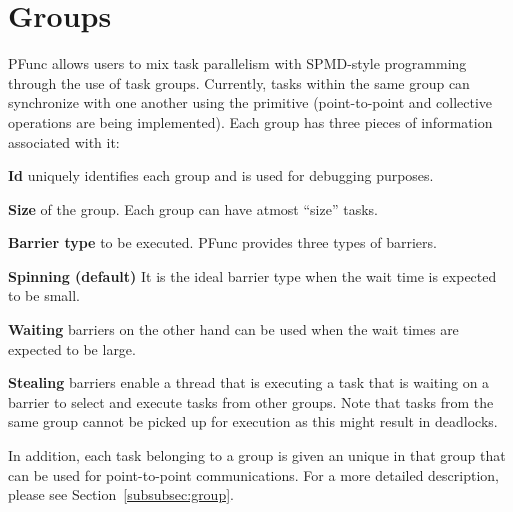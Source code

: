 \section{Groups}
\label{sec:group}
PFunc allows users to mix task parallelism with SPMD-style programming through
the use of task groups.  
%
Currently, tasks within the same group can synchronize with one another using 
the  primitive (point-to-point and collective operations are
being implemented).
%
Each group has three pieces of information associated with it:
%
\begin{list}{}{\leftmargin=1em}
\item \textbf{Id} uniquely identifies each group and is used for debugging
purposes.
\item \textbf{Size} of the group. Each group can have atmost ``size'' tasks.
\item \textbf{Barrier type} to be executed. PFunc provides three types of
barriers.
  \begin{list}{}{\leftmargin=1em}
  \item \textbf{Spinning (default)} It is the ideal barrier type when the wait
  time is expected to be small.
  \item \textbf{Waiting} barriers on the other hand can be used when the wait 
  times are expected to be large.
  \item \textbf{Stealing} barriers enable a thread that is executing a task 
  that is waiting on a barrier to select and execute tasks from other groups.
  Note that tasks from the same group cannot be picked up for execution as 
  this might result in deadlocks.
  \end{list}
\end{list}
%
In addition, each task belonging to a group is given an unique  in
that group that can be used for point-to-point communications.
%
For a more detailed description, please see Section~\ref{subsubsec:group}.

